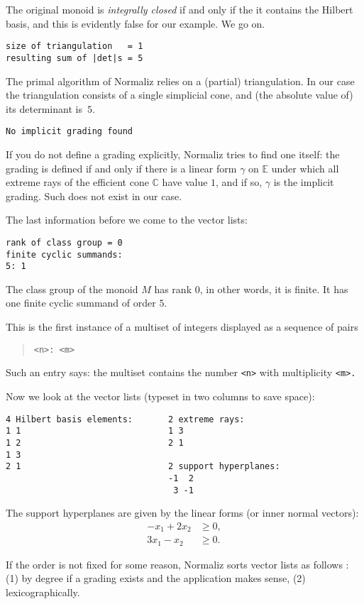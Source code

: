 \documentclass[12pt,a4paper]{scrartcl}
\theoremstyle{definition}
\def\CC{{\mathbb C}}
\def\EE{{\mathbb E}}
\begin{document}
The original monoid is \emph{integrally closed} if and only if the it contains the Hilbert basis, and this is evidently false for our example. We go on.

\begin{Verbatim}
size of triangulation   = 1
resulting sum of |det|s = 5
\end{Verbatim}
The primal algorithm of Normaliz relies on a (partial) triangulation. In our case the triangulation consists of a single simplicial cone, and (the absolute value of) its determinant is~$5$.
\begin{Verbatim}
No implicit grading found
\end{Verbatim}
If you do not define a grading explicitly, Normaliz tries to find one itself: the grading is defined if and only if there is a linear form $\gamma$ on $\EE$ under which all extreme rays of the efficient cone $\CC$ have value $1$, and if so, $\gamma$ is the implicit grading. Such does not exist in our case.

The last information before we come to the vector lists:
\begin{Verbatim}
rank of class group = 0
finite cyclic summands:
5: 1  
\end{Verbatim}
The class group of the monoid $M$ has rank $0$, in other words, it is finite. It has one finite cyclic summand of order $5$.

This is the first instance of a multiset of integers displayed as a sequence of pairs 
\begin{quote}
	\verb|<n>: <m>|
\end{quote} 
Such an entry says: the multiset contains the number \verb|<n>| with multiplicity \verb|<m>.| 


Now we look at the vector lists (typeset in two columns to save space):
\begin{Verbatim}
4 Hilbert basis elements:       2 extreme rays:
1 1                             1 3
1 2                             2 1
1 3
2 1                             2 support hyperplanes:
                                -1  2
                                 3 -1
\end{Verbatim}

The support hyperplanes are given by the linear forms (or inner normal vectors):
\begin{align*}
	-x_1+2x_2&\ge 0,\\
	3x_1-x_2&\ge 0.
\end{align*}

If the order is not fixed for some reason, Normaliz sorts vector lists as follows : (1) by degree if a grading exists and the application makes sense, (2) lexicographically.
\end{document}
